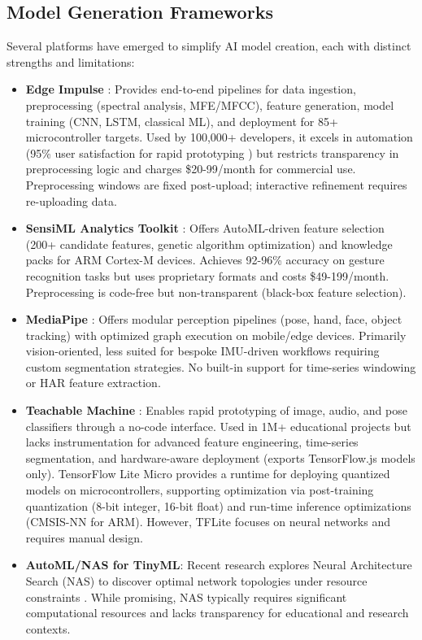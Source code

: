 \subsection{Model Generation Frameworks}
Several platforms have emerged to simplify AI model creation, each with distinct strengths and limitations:
\begin{itemize}
    \item \textbf{Edge Impulse} \cite{web:Edge_Impulse}: Provides end-to-end pipelines for data ingestion, preprocessing (spectral analysis, MFE/MFCC), feature generation, model training (CNN, LSTM, classical ML), and deployment for 85+ microcontroller targets. Used by 100,000+ developers, it excels in automation (95\% user satisfaction for rapid prototyping \cite{merenda2020edge}) but restricts transparency in preprocessing logic and charges \$20-99/month for commercial use. Preprocessing windows are fixed post-upload; interactive refinement requires re-uploading data.
    \item \textbf{SensiML Analytics Toolkit} \cite{web:SensiML}: Offers AutoML-driven feature selection (200+ candidate features, genetic algorithm optimization) and knowledge packs for ARM Cortex-M devices. Achieves 92-96\% accuracy on gesture recognition tasks but uses proprietary formats and costs \$49-199/month. Preprocessing is code-free but non-transparent (black-box feature selection).
    \item \textbf{MediaPipe} \cite{web:Google_Mediapipe}: Offers modular perception pipelines (pose, hand, face, object tracking) with optimized graph execution on mobile/edge devices. Primarily vision-oriented, less suited for bespoke IMU-driven workflows requiring custom segmentation strategies. No built-in support for time-series windowing or HAR feature extraction.
    \item \textbf{Teachable Machine} \cite{web:Google_TeachableMachine}: Enables rapid prototyping of image, audio, and pose classifiers through a no-code interface. Used in 1M+ educational projects but lacks instrumentation for advanced feature engineering, time-series segmentation, and hardware-aware deployment (exports TensorFlow.js models only).
TensorFlow Lite Micro \cite{david2020tensorflow} provides a runtime for deploying quantized models on microcontrollers, supporting optimization via post-training quantization (8-bit integer, 16-bit float) and run-time inference optimizations (CMSIS-NN for ARM). However, TFLite focuses on neural networks and requires manual design.
    \item \textbf{AutoML/NAS for TinyML}: Recent research explores Neural Architecture Search (NAS) to discover optimal network topologies under resource constraints \cite{cai2018proxylessnas}. While promising, NAS typically requires significant computational resources and lacks transparency for educational and research contexts.
\end{itemize}
